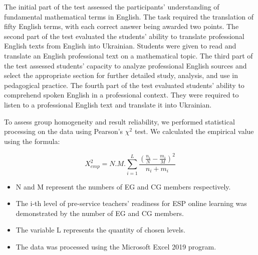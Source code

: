 The initial part of the test assessed the participants' understanding of
fundamental mathematical terms in English. The task required the
translation of fifty English terms, with each correct answer being
awarded two points. The second part of the test evaluated the students'
ability to translate professional English texts from English into
Ukrainian. Students were given to read and translate an English
professional text on a mathematical topic. The third part of the test
assessed students' capacity to analyze professional English sources and
select the appropriate section for further detailed study, analysis, and
use in pedagogical practice. The fourth part of the test evaluated
students' ability to comprehend spoken English in a professional
context. They were required to listen to a professional English text and
translate it into Ukrainian.

To assess group homogeneity and result reliability, we performed
statistical processing on the data using Pearson's $\chi^2$ test.
We calculated the empirical value using the formula:

\begin{equation}\label{eq01}
X^{2}_{emp} = N . M . \sum_{i=1}^{L}\frac{ (\frac{n_{i}}{N}-\frac{m_{i}}{M})^{2}}{n_{i}+m_{i}}
\end{equation}
 

\begin{itemize}
    \item N and M represent the numbers of EG and CG members respectively.
    \item The i-th level of pre-service teachers' readiness for ESP online
learning was demonstrated by the number of EG and CG members.
    \item The variable L represents the quantity of chosen levels. 
    \item The data was processed using the Microsoft Excel 2019 program.
\end{itemize}
